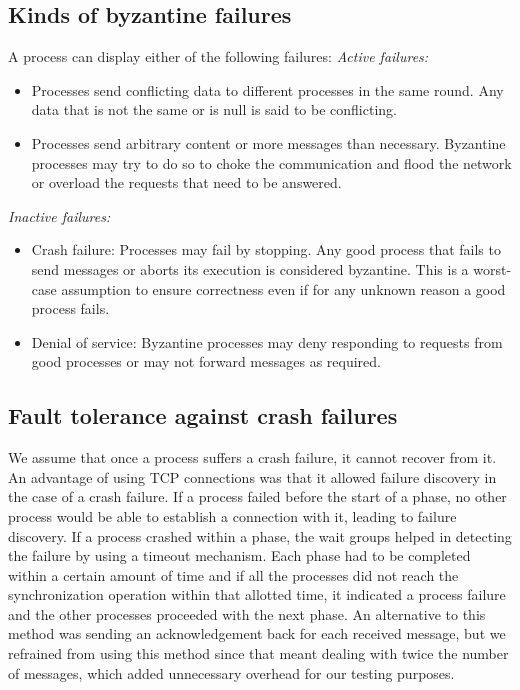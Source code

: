 \subsection{Kinds of byzantine failures}
\label{sec:behavior}
A process can display either of the following failures:
\textit{Active failures:}
\begin{itemize}
    \item Processes send conflicting data to different processes in the same round. Any data that is not the same or is null is said to be conflicting.
    \item Processes send arbitrary content or more messages than necessary. Byzantine processes may try to do so to choke the communication and flood the network or overload the requests that need to be answered.
\end{itemize}
\textit{Inactive failures:}
\begin{itemize}
    \item Crash failure: Processes may fail by stopping. Any good process that fails to send messages or aborts its execution is considered byzantine. This is a worst-case assumption to ensure correctness even if for any unknown reason a good process fails.
    \item Denial of service: Byzantine processes may deny responding to requests from good processes or may not forward messages as required. 
\end{itemize}

\subsection{Fault tolerance against crash failures}
We assume that once a process suffers a crash failure, it cannot recover from it. An advantage of using TCP connections was that it allowed failure discovery in the case of a crash failure. If a process failed before the start of a phase, no other process would be able to establish a connection with it, leading to failure discovery. If a process crashed within a phase, the wait groups helped in detecting the failure by using a timeout mechanism. Each phase had to be completed within a certain amount of time and if all the processes did not reach the synchronization operation within that allotted time, it indicated a process failure and the other processes proceeded with the next phase. 
An alternative to this method was sending an acknowledgement back for each received message, but we refrained from using this method since that meant dealing with twice the number of messages, which added unnecessary overhead for our testing purposes. 

